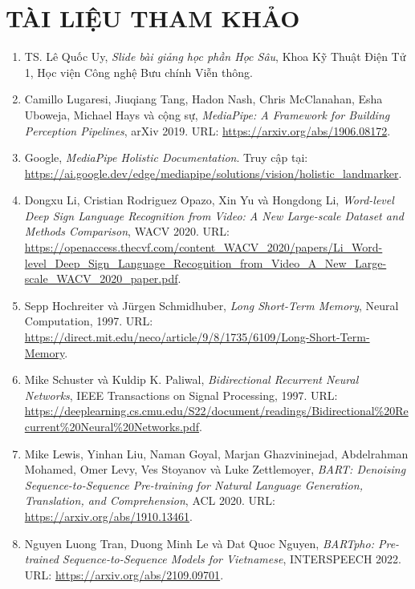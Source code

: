 ﻿\section*{TÀI LIỆU THAM KHẢO}

\begingroup
\sloppy
\begin{enumerate}
    \item TS. Lê Quốc Uy, \textit{Slide bài giảng học phần Học Sâu}, Khoa Kỹ Thuật Điện Tử 1, Học viện Công nghệ Bưu chính Viễn thông.

    \item Camillo Lugaresi, Jiuqiang Tang, Hadon Nash, Chris McClanahan, Esha Uboweja, Michael Hays và cộng sự, \textit{MediaPipe: A Framework for Building Perception Pipelines}, arXiv 2019. URL:
    \url{https://arxiv.org/abs/1906.08172}.

    \item Google, \textit{MediaPipe Holistic Documentation}. Truy cập tại:
    \url{https://ai.google.dev/edge/mediapipe/solutions/vision/holistic_landmarker}.

    \item Dongxu Li, Cristian Rodriguez Opazo, Xin Yu và Hongdong Li, \textit{Word-level Deep Sign Language Recognition from Video: A New Large-scale Dataset and Methods Comparison}, WACV 2020. URL:
    \url{https://openaccess.thecvf.com/content_WACV_2020/papers/Li_Word-level_Deep_Sign_Language_Recognition_from_Video_A_New_Large-scale_WACV_2020_paper.pdf}.

    \item Sepp Hochreiter và Jürgen Schmidhuber, \textit{Long Short-Term Memory}, Neural Computation, 1997. URL:
    \url{https://direct.mit.edu/neco/article/9/8/1735/6109/Long-Short-Term-Memory}.

    \item Mike Schuster và Kuldip K. Paliwal, \textit{Bidirectional Recurrent Neural Networks}, IEEE Transactions on Signal Processing, 1997. URL:
    \url{https://deeplearning.cs.cmu.edu/S22/document/readings/Bidirectional%20Recurrent%20Neural%20Networks.pdf}.

    \item Mike Lewis, Yinhan Liu, Naman Goyal, Marjan Ghazvininejad, Abdelrahman Mohamed, Omer Levy, Ves Stoyanov và Luke Zettlemoyer, \textit{BART: Denoising Sequence-to-Sequence Pre-training for Natural Language Generation, Translation, and Comprehension}, ACL 2020. URL:
    \url{https://arxiv.org/abs/1910.13461}.

    \item Nguyen Luong Tran, Duong Minh Le và Dat Quoc Nguyen, \textit{BARTpho: Pre-trained Sequence-to-Sequence Models for Vietnamese}, INTERSPEECH 2022. URL:
    \url{https://arxiv.org/abs/2109.09701}.


\end{enumerate}
